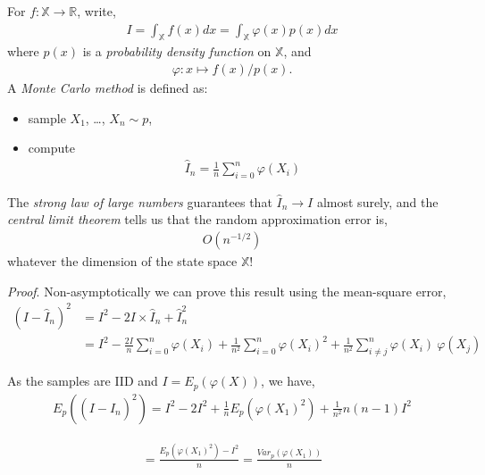 \documentclass[11pt,a4paper]{article}
\begin{document}
For \(f:\mathbb{X \rightarrow R}\), write,
\begin{align}
I = \int_{\mathbb{X}}^{}{f(x)}dx = \int_{\mathbb{X}}^{}{\varphi(x)p(x)}dx
\end{align}
where \(p(x)\) is a \emph{probability density function} on \(\mathbb{X}\), and
\begin{align}
\varphi:x \mapsto f(x)/p(x).
\end{align}
A \emph{Monte Carlo method} is defined as:
\begin{itemize}
\item
sample \(X_{1}\), \ldots, \(X_{n} \sim p\),
\item
compute
\begin{align}
{\widehat{I}}_{n} = \frac{1}{n}\sum_{i = 0}^{n}{\varphi(X_{i})}
\end{align}
\end{itemize}
The \emph{strong law of large numbers} guarantees that
\({\widehat{I}}_{n} \rightarrow I\) almost surely, 
and the \emph{central limit theorem} tells us that the random approximation error is,
\begin{align}
O\left(n^{- 1/2}\right)
\end{align}
whatever the dimension of the state space \(\mathbb{X}\)!

\emph{Proof}. 
Non-asymptotically we can prove this result using the mean-square error,
\begin{equation}
\begin{split}
\left( I - {\widehat{I}}_{n} \right)^{2} &= I^{2} - 2I \times {\widehat{I}}_{n} + {\widehat{I}}_{n}^{2} \\
&= I^{2} - \frac{2I}{n}\sum_{i = 0}^{n}{\varphi\left( X_{i} \right)} + \frac{1}{n^{2}}\sum_{i = 0}^{n}{\varphi\left( X_{i} \right)^{2}} + \frac{1}{n^{2}}\sum_{i \neq j}^{n}{\varphi\left( X_{i} \right)\ \varphi(X_{j})}
\end{split}
\end{equation}

As the samples are IID and \(I = E_{p}(\varphi(X))\), we have,
\begin{align}
E_{p}\left( \left( I - {\widehat{I}}_{n} \right)^{2} \right) 
= I^{2} - 2I^{2} + \frac{1}{n}E_{p}\left( \varphi\left( X_{1} \right)^{2} \right) + \frac{1}{n^{2}}n(n - 1)I^{2}\end{align}

\begin{align}= \frac{E_{p}\left( \varphi\left( X_{1} \right)^{2} \right) - I^{2}}{n} = \frac{Var_{p}\left( \varphi\left( X_{1} \right) \right)}{n}\end{align}
\end{document}
